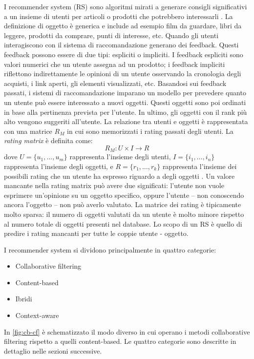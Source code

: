 I recommender system (RS) sono algoritmi mirati a generare consigli significativi a un insieme di utenti per articoli o prodotti che potrebbero interessarli \cite{recsys-definition}. La definizione di oggetto è generica e include ad esempio film da guardare, libri da leggere, prodotti da comprare, punti di interesse, etc. 
Quando gli utenti interagiscono con il sistema di raccomandazione generano dei feedback. Questi feedback possono essere di due tipi: espliciti o impliciti. I feedback espliciti sono valori numerici che un utente assegna ad un prodotto; i feedback impliciti riflettono indirettamente le opinioni di un utente osservando la cronologia degli acquisti, i link aperti, gli elementi visualizzati, etc.
Basandosi sui feedback passati, i sistemi di raccomandazione imparano un modello per prevedere quanto un utente può essere interessato a nuovi oggetti. Questi oggetti sono poi ordinati in base alla pertinenza prevista per l'utente. In ultimo, gli oggetti con il rank più alto vengono suggeriti all'utente. La relazione tra utenti e oggetti è rappresentata con una matrice $R_M$ in cui sono memorizzati i rating passati degli utenti.
La \textit{rating matrix} è definita come: 
$$
R_M: U \times I \rightarrow R
$$
dove $U = \{u_1, \dots, u_m\}$ rappresenta l'insieme degli utenti, $I = \{i_1,\dots, i_n\}$ rappresenta l'insieme degli oggetti, e $R = \{r_1, \dots, r_k\}$ rappresenta l'insieme dei possibili rating che un utente ha espresso riguardo a degli oggetti \cite{survey-mattia}. Un valore mancante nella rating matrix può avere due significati: l'utente non vuole esprimere un'opinione su un oggetto specifico, oppure l'utente -- non conoscendo ancora l'oggetto -- non può averlo valutato. La matrice dei rating è tipicamente molto sparsa: il numero di oggetti valutati da un utente è molto minore rispetto al numero totale di oggetti presenti nel database. Lo scopo di un RS è quello di predire i rating mancanti per tutte le coppie utente - oggetto.

\vspace{5mm}
\noindent I recommender system si dividono principalmente in quattro categorie:
\begin{itemize}
	\item Collaborative filtering
	\item Content-based
	\item Ibridi
	\item Context-aware
\end{itemize}

\noindent In \autoref{fig:cb-cf} è schematizzato il modo diverso in cui operano i metodi collaborative filtering rispetto a quelli content-based. Le quattro categorie sono descritte in dettaglio nelle sezioni successive.

